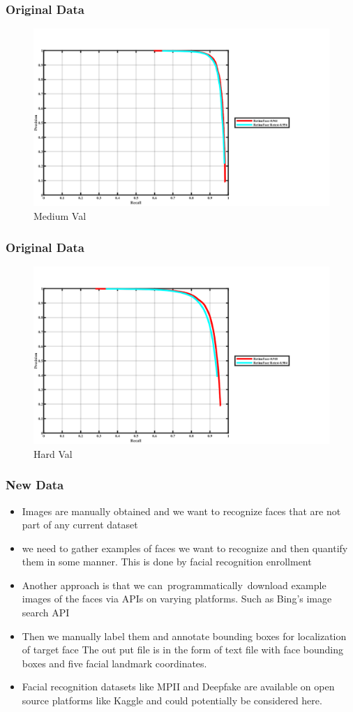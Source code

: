 \documentclass[11pt]{beamer}
\begin{document}
\begin{frame}
	\frametitle{Original Data}
	\begin{figure}
		\includegraphics[width=0.75\linewidth]{wider_pr_cruve_int_medium_val.png}
		\caption{Medium Val}
	\end{figure}
	
\end{frame}
\begin{frame}
	\frametitle{Original Data}
	\begin{figure}
		\includegraphics[width=0.75\linewidth]{wider_pr_cruve_int_hard_val.png}
		\caption{Hard Val}
	\end{figure}
	
\end{frame}
\begin{frame}
	\frametitle{New Data}
	\begin{itemize}
		\item Images are manually obtained and  we  want to recognize faces that are not part of any current dataset
		\item we need to gather examples of faces we want to recognize and then quantify them in some manner. This is done by facial recognition enrollment 
\item Another approach is that we  can programmatically download example images of the faces via APIs on varying platforms. Such as Bing’s image search API
\item Then we manually label them and annotate bounding boxes for localization of target face
		The out put file is in the form of text file with face bounding boxes and five facial landmark coordinates.
		\item Facial recognition datasets like MPII and Deepfake are available on open source platforms like Kaggle and could potentially be considered here.
	\end{itemize}
\end{frame}
\end{document}
